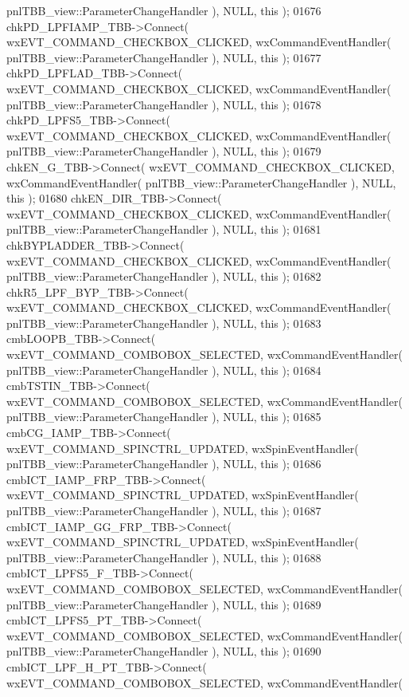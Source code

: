 \begin{DoxyCode}
      pnlTBB_view::ParameterChangeHandler ), NULL, \textcolor{keyword}{this} );
01676     chkPD_LPFIAMP_TBB->Connect( wxEVT\_COMMAND\_CHECKBOX\_CLICKED, wxCommandEventHandler( 
      pnlTBB_view::ParameterChangeHandler ), NULL, \textcolor{keyword}{this} );
01677     chkPD_LPFLAD_TBB->Connect( wxEVT\_COMMAND\_CHECKBOX\_CLICKED, wxCommandEventHandler( 
      pnlTBB_view::ParameterChangeHandler ), NULL, \textcolor{keyword}{this} );
01678     chkPD_LPFS5_TBB->Connect( wxEVT\_COMMAND\_CHECKBOX\_CLICKED, wxCommandEventHandler( 
      pnlTBB_view::ParameterChangeHandler ), NULL, \textcolor{keyword}{this} );
01679     chkEN_G_TBB->Connect( wxEVT\_COMMAND\_CHECKBOX\_CLICKED, wxCommandEventHandler( 
      pnlTBB_view::ParameterChangeHandler ), NULL, \textcolor{keyword}{this} );
01680     chkEN_DIR_TBB->Connect( wxEVT\_COMMAND\_CHECKBOX\_CLICKED, wxCommandEventHandler( 
      pnlTBB_view::ParameterChangeHandler ), NULL, \textcolor{keyword}{this} );
01681     chkBYPLADDER_TBB->Connect( wxEVT\_COMMAND\_CHECKBOX\_CLICKED, wxCommandEventHandler( 
      pnlTBB_view::ParameterChangeHandler ), NULL, \textcolor{keyword}{this} );
01682     chkR5_LPF_BYP_TBB->Connect( wxEVT\_COMMAND\_CHECKBOX\_CLICKED, wxCommandEventHandler( 
      pnlTBB_view::ParameterChangeHandler ), NULL, \textcolor{keyword}{this} );
01683     cmbLOOPB_TBB->Connect( wxEVT\_COMMAND\_COMBOBOX\_SELECTED, wxCommandEventHandler( 
      pnlTBB_view::ParameterChangeHandler ), NULL, \textcolor{keyword}{this} );
01684     cmbTSTIN_TBB->Connect( wxEVT\_COMMAND\_COMBOBOX\_SELECTED, wxCommandEventHandler( 
      pnlTBB_view::ParameterChangeHandler ), NULL, \textcolor{keyword}{this} );
01685     cmbCG_IAMP_TBB->Connect( wxEVT\_COMMAND\_SPINCTRL\_UPDATED, wxSpinEventHandler( 
      pnlTBB_view::ParameterChangeHandler ), NULL, \textcolor{keyword}{this} );
01686     cmbICT_IAMP_FRP_TBB->Connect( wxEVT\_COMMAND\_SPINCTRL\_UPDATED, wxSpinEventHandler( 
      pnlTBB_view::ParameterChangeHandler ), NULL, \textcolor{keyword}{this} );
01687     cmbICT_IAMP_GG_FRP_TBB->Connect( wxEVT\_COMMAND\_SPINCTRL\_UPDATED, wxSpinEventHandler( 
      pnlTBB_view::ParameterChangeHandler ), NULL, \textcolor{keyword}{this} );
01688     cmbICT_LPFS5_F_TBB->Connect( wxEVT\_COMMAND\_COMBOBOX\_SELECTED, wxCommandEventHandler( 
      pnlTBB_view::ParameterChangeHandler ), NULL, \textcolor{keyword}{this} );
01689     cmbICT_LPFS5_PT_TBB->Connect( wxEVT\_COMMAND\_COMBOBOX\_SELECTED, wxCommandEventHandler( 
      pnlTBB_view::ParameterChangeHandler ), NULL, \textcolor{keyword}{this} );
01690     cmbICT_LPF_H_PT_TBB->Connect( wxEVT\_COMMAND\_COMBOBOX\_SELECTED, wxCommandEventHandler( 

\end{DoxyCode}
